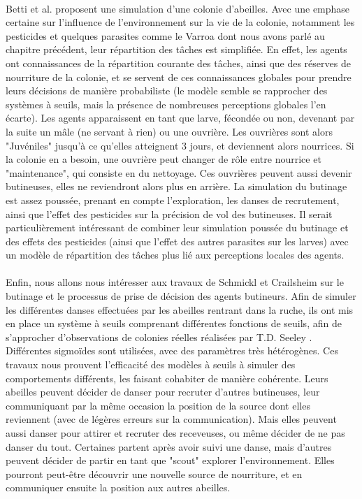         \paragraph{}
        Betti et al. \cite{betti_bee_2017} proposent une simulation d'une colonie d'abeilles. Avec une emphase certaine sur l'influence de l'environnement sur la vie de la colonie, notamment les pesticides et quelques parasites comme le Varroa dont nous avons parlé au chapitre précédent, leur répartition des tâches est simplifiée. En effet, les agents ont connaissances de la répartition courante des tâches, ainsi que des réserves de nourriture de la colonie, et se servent de ces connaissances globales pour prendre leurs décisions de manière probabiliste (le modèle semble se rapprocher des systèmes à seuils, mais la présence de nombreuses perceptions globales l'en écarte).
         Les agents apparaissent en tant que larve, fécondée ou non, devenant par la suite un mâle (ne servant à rien) ou une ouvrière. Les ouvrières sont alors "Juvéniles" jusqu'à ce qu'elles atteignent 3 jours, et deviennent alors nourrices. Si la colonie en a besoin, une ouvrière peut changer de rôle entre nourrice et "maintenance", qui consiste en du nettoyage. Ces ouvrières peuvent aussi devenir butineuses, elles ne reviendront alors plus en arrière.
         La simulation du butinage est assez poussée, prenant en compte l'exploration, les danses de recrutement, ainsi que l'effet des pesticides sur la précision de vol des butineuses. Il serait particulièrement intéressant de combiner leur simulation poussée du butinage et des effets des pesticides (ainsi que l'effet des autres parasites sur les larves) avec un modèle de répartition des tâches plus lié aux perceptions locales des agents.
        
        \paragraph{}
        Enfin, nous allons nous intéresser aux travaux de Schmickl et Crailsheim \cite{schmickl_costs_2004} sur le butinage et le processus de prise de décision des agents butineurs. Afin de simuler les différentes danses effectuées par les abeilles rentrant dans la ruche, ils ont mis en place un système à seuils comprenant différentes fonctions de seuils, afin de s'approcher d'observations de colonies réelles réalisées par T.D. Seeley \cite{seeley_tremble_1992}. Différentes sigmoïdes sont utilisées, avec des paramètres très hétérogènes. Ces travaux nous prouvent l'efficacité des modèles à seuils à simuler des comportements différents, les faisant cohabiter de manière cohérente. Leurs abeilles peuvent décider de danser pour recruter d'autres butineuses, leur communiquant par la même occasion la position de la source dont elles reviennent (avec de légères erreurs sur la communication). Mais elles peuvent aussi danser pour attirer et recruter des receveuses, ou même décider de ne pas danser du tout. Certaines partent après avoir suivi une danse, mais d'autres peuvent décider de partir en tant que "scout" explorer l'environnement. Elles pourront peut-être découvrir une nouvelle source de nourriture, et en communiquer ensuite la position aux autres abeilles.
        
